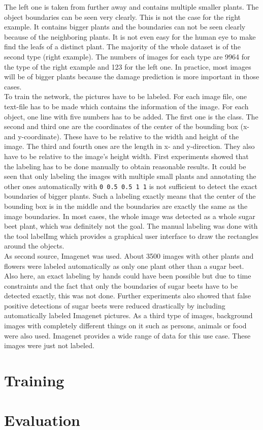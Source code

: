 The left one is taken from further away and contains multiple smaller plants. The object boundaries can be seen very clearly. This is not the case for the right example. It contains bigger plants and the boundaries can not be seen clearly because of the neighboring plants. It is not even easy for the human eye to make find the leafs of a distinct plant. The majority of the whole dataset is of the second type (right example). The numbers of images for each type are 9964 for the type of the right example and 123 for the left one. In practice, most images will be of bigger plants because the damage prediction is more important in those cases.\\

To train the network, the pictures have to be labeled. For each image file, one text-file has to be made which contains the information of the image. For each object, one line with five numbers has to be added. The first one is the class. The second and third one are the coordinates of the center of the bounding box (x- and y-coordinate). These have to be relative to the width and height of the image. The third and fourth ones are the length in x- and y-direction. They also have to be relative to the image's height width. First experiments showed that the labeling has to be done manually to obtain reasonable results. It could be seen that only labeling the images with multiple small plants and annotating the other ones automatically with \texttt{0 0.5 0.5 1 1} is not sufficient to detect the exact boundaries of bigger plants. Such a labeling exactly means that the center of the bounding box is in the middle and the boundaries are exactly the same as the image boundaries. In most cases, the whole image was detected as a whole sugar beet plant, which was definitely not the goal. The manual labeling was done with the tool labelImg \cite{labelimg} which provides a graphical user interface to draw the rectangles around the objects. \\

As second source, Imagenet was used. About 3500 images with other plants and flowers were labeled automatically as only one plant other than a sugar beet. Also here, an exact labeling by hands could have been possible but due to time constraints and the fact that only the boundaries of sugar beets have to be detected exactly, this was not done. Further experiments also showed that false positive detections of sugar beets were reduced drastically by including automatically labeled Imagenet pictures. As a third type of images, background images with completely different things on it such as persons, animals or food were also used. Imagenet provides a wide range of data for this use case. These images were just not labeled. 

\section{Training}

\section{Evaluation}
